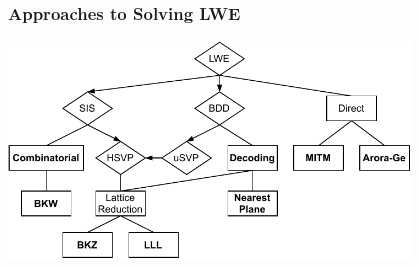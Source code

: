\documentclass[t, aspectratio=169]{beamer}
\begin{document}
\begin{frame}
    \frametitle{Approaches to Solving LWE}
    \begin{center}
        \includegraphics[width=0.8\textwidth]{../thesis/graphics/algorithms_overview.pdf}
    \end{center}
\end{frame}
\end{document}
